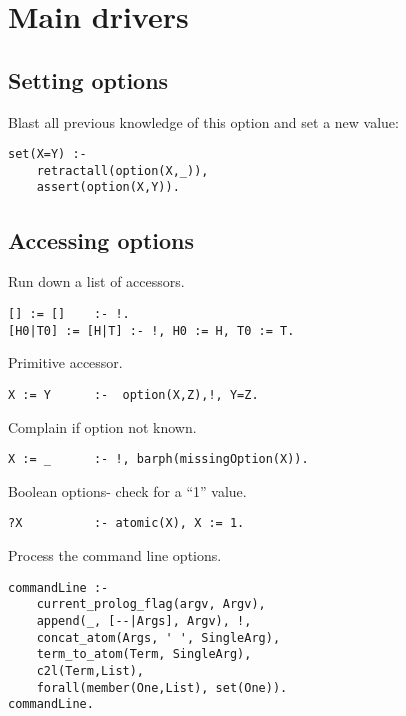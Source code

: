\section{ Main drivers
}
\subsection{ Setting options
}
Blast all previous knowledge of this option
and set a new value:
\begin{Verbatim}
set(X=Y) :-
	retractall(option(X,_)),
	assert(option(X,Y)).
\end{Verbatim}
\subsection{ Accessing options
}
Run down a list of accessors.
\begin{Verbatim}
[] := []    :- !.
[H0|T0] := [H|T] :- !, H0 := H, T0 := T.
\end{Verbatim}
Primitive accessor.
\begin{Verbatim}
X := Y      :-  option(X,Z),!, Y=Z.
\end{Verbatim}
Complain if option not known.
\begin{Verbatim}
X := _      :- !, barph(missingOption(X)).
\end{Verbatim}
Boolean options- check for a ``1'' value.
\begin{Verbatim}
?X          :- atomic(X), X := 1.
\end{Verbatim}
Process the command line options.
\begin{Verbatim}
commandLine :-
	current_prolog_flag(argv, Argv),
	append(_, [--|Args], Argv), !,
	concat_atom(Args, ' ', SingleArg),
	term_to_atom(Term, SingleArg),
	c2l(Term,List),
	forall(member(One,List), set(One)).
commandLine.
\end{Verbatim}
